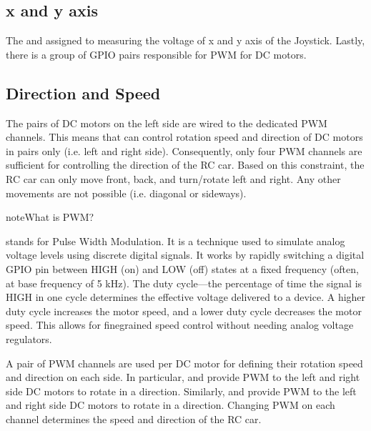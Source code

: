 \documentclass[letterpaper,10pt,english]{sphinxmanual}
\begin{document}
\subsection{x\sphinxhyphen{} and y\sphinxhyphen{} axis}
\label{\detokenize{overview:x-and-y-axis}}
\sphinxAtStartPar
The  and  assigned to measuring the voltage of x\sphinxhyphen{} and y\sphinxhyphen{} axis of the Joystick. Lastly, there is a group of GPIO pairs responsible for PWM for DC motors.


\subsection{Direction and Speed}
\label{\detokenize{overview:direction-and-speed}}
\sphinxAtStartPar
The pairs of DC motors on the left side are wired to the dedicated PWM channels. This means that  can control rotation speed and direction of DC motors in pairs only (i.e. left and right side).
Consequently, only four PWM channels are sufficient for controlling the direction of the RC car.
Based on this constraint, the RC car can only move front, back, and turn/rotate left and right. Any other movements are not possible (i.e. diagonal or sideways).

\begin{sphinxadmonition}{note}{What is PWM?}

\sphinxAtStartPar
{} stands for Pulse Width Modulation. It is a technique used to simulate analog voltage levels using discrete digital signals. It works by
rapidly switching a digital GPIO pin between HIGH (on) and LOW (off) states at a fixed frequency (often, at base frequency of 5 kHz).
The duty cycle—the percentage of time the signal is HIGH in one cycle determines the effective voltage delivered to a device.
A higher duty cycle increases the motor speed, and a lower duty cycle decreases the motor speed. This allows for fine\sphinxhyphen{}grained speed control
without needing analog voltage regulators.
\end{sphinxadmonition}

\sphinxAtStartPar
A pair of PWM channels are used per DC motor for defining their rotation speed and direction on each side.
In particular,  and  provide PWM to the left\sphinxhyphen{} and right\sphinxhyphen{} side DC motors to rotate in a  direction.
Similarly,  and  provide PWM to the left\sphinxhyphen{} and right\sphinxhyphen{} side DC motors to rotate in a  direction.
Changing PWM on each channel determines the speed and direction of the RC car.
\end{document}
